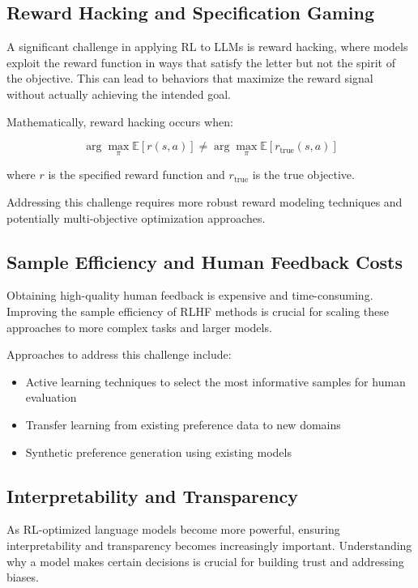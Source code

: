 \documentclass{article}
\begin{document}
\subsection{Reward Hacking and Specification Gaming}

A significant challenge in applying RL to LLMs is reward hacking, where models exploit the reward function in ways that satisfy the letter but not the spirit of the objective. This can lead to behaviors that maximize the reward signal without actually achieving the intended goal.

Mathematically, reward hacking occurs when:

\begin{equation}
\arg\max_\pi \mathbb{E}[r(s, a)] \neq \arg\max_\pi \mathbb{E}[r_{\text{true}}(s, a)]
\end{equation}

where $r$ is the specified reward function and $r_{\text{true}}$ is the true objective.

Addressing this challenge requires more robust reward modeling techniques and potentially multi-objective optimization approaches.

\subsection{Sample Efficiency and Human Feedback Costs}

Obtaining high-quality human feedback is expensive and time-consuming. Improving the sample efficiency of RLHF methods is crucial for scaling these approaches to more complex tasks and larger models.

Approaches to address this challenge include:
\begin{itemize}
    \item Active learning techniques to select the most informative samples for human evaluation
    \item Transfer learning from existing preference data to new domains
    \item Synthetic preference generation using existing models
\end{itemize}

\subsection{Interpretability and Transparency}

As RL-optimized language models become more powerful, ensuring interpretability and transparency becomes increasingly important. Understanding why a model makes certain decisions is crucial for building trust and addressing biases.
\end{document}
